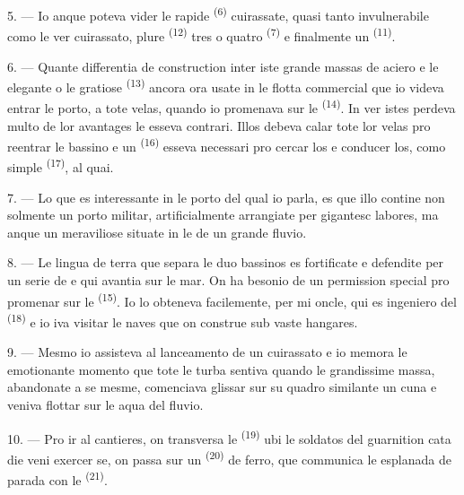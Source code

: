 5. --- Io anque poteva vider le rapide 
\textsuperscript{(6)} cuirassate, quasi tanto invulnerabile como le ver
cuirassato, plure  \textsuperscript{(12)} tres o
quatro  \textsuperscript{(7)} e finalmente un
 \textsuperscript{(11)}. 

6. --- Quante differentia de construction inter iste grande massas de aciero e
le elegante  o le gratiose 
\textsuperscript{(13)} ancora ora usate in le flotta commercial que io videva
entrar le porto, a tote velas, quando io promenava sur le 
\textsuperscript{(14)}. In ver istes perdeva multo de lor avantages
 le  esseva contrari. Illos debeva calar tote lor
velas pro reentrar le bassino e un  \textsuperscript{(16)}
esseva necessari pro cercar los e conducer los, como simple 
\textsuperscript{(17)}, al quai.

\VUsaut{3.0mm}
\VUsaut{3.0mm}

7. --- Lo que es interessante in le porto del qual io parla, es que illo contine
non solmente un porto militar, artificialmente arrangiate per gigantesc labores,
ma anque un meraviliose  situate in le
 de un grande fluvio.

8. --- Le lingua de terra que separa le duo bassinos es fortificate e defendite
per un serie de  e  qui avantia sur le mar.
On ha besonio de un permission special pro promenar sur le 
\textsuperscript{(15)}. Io lo obteneva facilemente, per mi oncle, qui es ingeniero
del  \textsuperscript{(18)} e io iva visitar le naves que on
construe sub vaste hangares.

9. --- Mesmo io assisteva al lanceamento de un cuirassato e io memora le
emotionante momento que tote le turba sentiva quando le grandissime massa,
abandonate a se mesme, comenciava glissar sur su quadro similante un cuna e
veniva flottar sur le aqua del fluvio.

10. --- Pro ir al cantieres, on transversa le 
\textsuperscript{(19)} ubi le soldatos del guarnition cata die veni exercer se,
on passa sur un  \textsuperscript{(20)} de ferro, que
communica le esplanada de parada con le 
\textsuperscript{(21)}.

